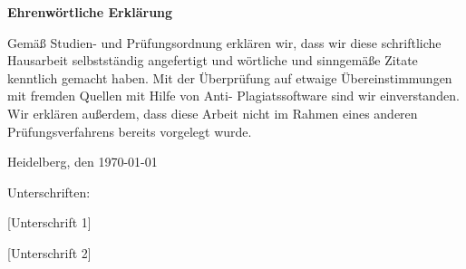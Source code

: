 \newpage
\fontsize{18pt}{0pt}\textbf{Ehrenwörtliche Erklärung}
\parskip=32pt

\noindent Gemäß Studien- und Prüfungsordnung erklären wir, dass wir diese schriftliche 
Hausarbeit selbstständig angefertigt und wörtliche und sinngemäße Zitate 
kenntlich gemacht haben. Mit der Überprüfung auf etwaige Übereinstimmungen mit 
fremden Quellen mit Hilfe von Anti- Plagiatssoftware sind wir einverstanden. 
Wir erklären außerdem, dass diese Arbeit nicht im Rahmen eines anderen 
Prüfungsverfahrens bereits vorgelegt wurde. 
\parskip=32pt

\noindent Heidelberg, den \today
\parskip=32pt

\noindent Unterschriften:

[Unterschrift 1]

[Unterschrift 2]